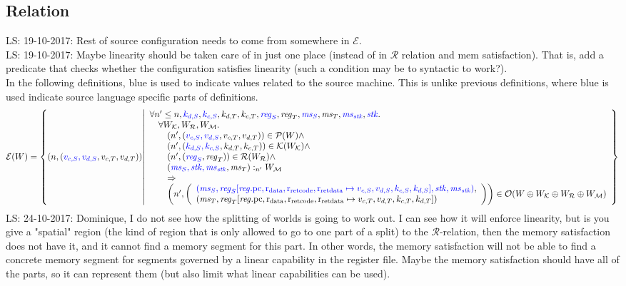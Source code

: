 \documentclass[a3paper]{article}
\newcommand\lau[1]{{\color{purple} \sf \footnotesize {LS: #1}}\\}
\newcommand{\npair}[2][n]{\left(#1,#2\right)}
\newcommand{\typesetlr}[1]{\mathcal{#1}}
\newcommand{\lre}{\typesetlr{E}}
\newcommand{\lrk}{\typesetlr{K}}
\newcommand{\lrr}{\typesetlr{R}}
\newcommand{\lro}{\typesetlr{O}}
\newcommand{\lrp}{\typesetlr{P}}
\newcommand{\lrm}{\typesetlr{M}}
\newcommand{\stpair}[3][]{
\ifthenelse{\equal{#1}{}}
{\left(\src{#2_S},#3_T\right)}
{\left(\src{#2},#3\right)}}
\newcommand{\memSat}[3][n]{#2 :_{#1}#3}
\newcommand{\sourcecolor}{\color{blue}}
\newcommand{\src}[1]{{\sourcecolor #1}}
\newcommand{\update}[2]{[#1 \mapsto #2]}
\newcommand{\updReg}[2]{\update{\reg.#1}{#2}}
\newcommand{\var}[1]{\mathit{#1}}
\newcommand{\reg}{\var{reg}}
\newcommand{\ms}{\var{ms}}
\newcommand{\stk}{\var{stk}}
\newcommand{\pcreg}{\mathrm{pc}}
\newcommand{\rretc}{\mathrm{r}_\mathrm{ret code}}
\newcommand{\rretd}{\mathrm{r}_\mathrm{ret data}}
\newcommand{\rdata}{\mathrm{r}_\mathrm{data}}
\begin{document}
\subsection{Relation}
\lau{19-10-2017: Rest of source configuration needs to come from somewhere in $\lre$.}
\lau{19-10-2017: Maybe linearity should be taken care of in just one place (instead of in $\lrr$ relation and mem satisfaction). That is, add a predicate that checks whether the configuration satisfies linearity (such a condition may be to syntactic to work?).}
In the following definitions, \src{blue} is used to indicate values related to the source machine. This is unlike previous definitions, where \src{blue} is used  indicate source language specific parts of definitions.
\[
  \lre(W) = \left\{ \npair{\stpair[.]{v_{c,S},v_{d,S}}{v_{c,T},v_{d,T}}} \middle| 
    \begin{array}{l}
      \forall n' \leq n, \src{k_{d,S}}, \src{k_{c,S}}, k_{d,T}, k_{c,T}, \src{\reg_S}, \reg_T, \src{\ms_S}, \ms_T, \src{\ms_\stk}, \src{\stk} \ldotp\\
      \quad \forall W_\lrk, W_\lrr, W_\lrm \ldotp \\
      \qquad\npair[n']{\stpair[.]{v_{c,S},v_{d,S}}{v_{c,T},v_{d,T}}} \in \lrp(W) \wedge \\
      \qquad\npair[n']{\stpair[.]{k_{d,S},k_{c,S}}{k_{d,T},k_{c,T}}} \in \lrk(W_\lrk) \wedge \\
      \qquad\npair[n']{\stpair{\reg}{\reg}} \in \lrr(W_\lrr) \wedge\\
      \qquad\memSat[n']{\stpair[.]{\ms_S,\stk,\ms_\stk}{\ms_T}}{W_\lrm} \\
      \qquad\Rightarrow\\
      \qquad\npair[n']{\left(\array{l}\src{(\ms_S,\reg_S\updReg{\pcreg,\rdata,\rretc,\rretd}{v_{c,S},v_{d,S},k_{c,S},k_{d,S}},\stk, \ms_\stk)},\\
                                          (\ms_T,\reg_T\updReg{\pcreg,\rdata,\rretc,\rretd}{v_{c,T},v_{d
,T},k_{c,T},k_{d,T}})\endarray\right)}
      \in \lro(W\oplus W_\lrk \oplus W_\lrr \oplus W_\lrm)
    \end{array}
    \right\}
\]
\lau{24-10-2017: Dominique, I do not see how the splitting of worlds is going to work out. I can see how it will enforce linearity, but is you give a "spatial" region (the kind of region that is only allowed to go to one part of a split) to the $\lrr$-relation, then the memory satisfaction does not have it, and it cannot find a memory segment for this part. In other words, the memory satisfaction will not be able to find a concrete memory segment for segments governed by a linear capability in the register file. Maybe the memory satisfaction should have all of the parts, so it can represent them (but also limit what linear capabilities can be used).}
\end{document}
